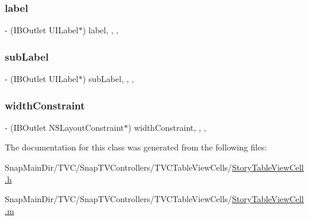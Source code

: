 \hypertarget{interface_story_table_view_cell_a79458e3fc3760a833c179ca694755e3f}{}\label{interface_story_table_view_cell_a79458e3fc3760a833c179ca694755e3f} 
\subsubsection{\texorpdfstring{label}{label}}
{\footnotesize\ttfamily -\/ (I\+B\+Outlet U\+I\+Label$\ast$) label\hspace{0.3cm}{\ttfamily [read]}, {\ttfamily [write]}, {\ttfamily [nonatomic]}, {\ttfamily [weak]}}

\hypertarget{interface_story_table_view_cell_a9856d0cd32c88868e4af180807ba90a2}{}\label{interface_story_table_view_cell_a9856d0cd32c88868e4af180807ba90a2} 
\subsubsection{\texorpdfstring{sub\+Label}{subLabel}}
{\footnotesize\ttfamily -\/ (I\+B\+Outlet U\+I\+Label$\ast$) sub\+Label\hspace{0.3cm}{\ttfamily [read]}, {\ttfamily [write]}, {\ttfamily [nonatomic]}, {\ttfamily [weak]}}

\hypertarget{interface_story_table_view_cell_a6319661885c9659a1ca4854a27ff1088}{}\label{interface_story_table_view_cell_a6319661885c9659a1ca4854a27ff1088} 
\subsubsection{\texorpdfstring{width\+Constraint}{widthConstraint}}
{\footnotesize\ttfamily -\/ (I\+B\+Outlet N\+S\+Layout\+Constraint$\ast$) width\+Constraint\hspace{0.3cm}{\ttfamily [read]}, {\ttfamily [write]}, {\ttfamily [nonatomic]}, {\ttfamily [weak]}}



The documentation for this class was generated from the following files\+:\begin{DoxyCompactItemize}
\item 
Snap\+Main\+Dir/\+T\+V\+C/\+Snap\+T\+V\+Controllers/\+T\+V\+C\+Table\+View\+Cells/\hyperlink{_story_table_view_cell_8h}{Story\+Table\+View\+Cell.\+h}\item 
Snap\+Main\+Dir/\+T\+V\+C/\+Snap\+T\+V\+Controllers/\+T\+V\+C\+Table\+View\+Cells/\hyperlink{_story_table_view_cell_8m}{Story\+Table\+View\+Cell.\+m}\end{DoxyCompactItemize}
